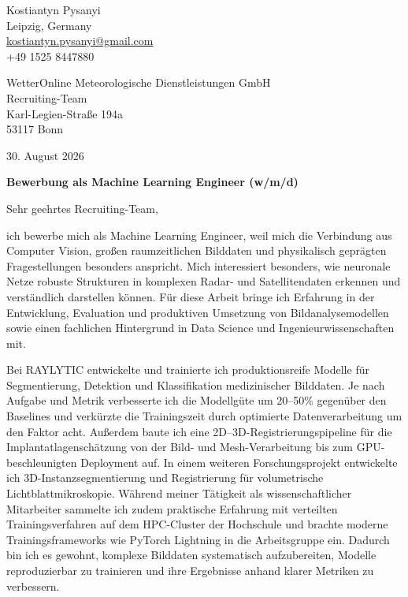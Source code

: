 \documentclass[11pt,a4paper]{article}
\begin{document}
\begin{flushright}
Kostiantyn Pysanyi\\
Leipzig, Germany\\
\href{mailto:kostiantyn.pysanyi@gmail.com}{kostiantyn.pysanyi@gmail.com}\\
+49 1525 8447880
\end{flushright}

WetterOnline Meteorologische Dienstleistungen GmbH\\
Recruiting-Team\\
Karl-Legien-Straße 194a\\
53117 Bonn

\begin{flushright}
30. August 2026
\end{flushright}

\textbf{Bewerbung als Machine Learning Engineer (w/m/d)}

Sehr geehrtes Recruiting-Team,

ich bewerbe mich als Machine Learning Engineer, weil mich die Verbindung aus Computer Vision, großen raumzeitlichen Bilddaten und physikalisch geprägten Fragestellungen besonders anspricht. Mich interessiert besonders, wie neuronale Netze robuste Strukturen in komplexen Radar- und Satellitendaten erkennen und verständlich darstellen können. Für diese Arbeit bringe ich Erfahrung in der Entwicklung, Evaluation und produktiven Umsetzung von Bildanalysemodellen sowie einen fachlichen Hintergrund in Data Science und Ingenieurwissenschaften mit.

Bei RAYLYTIC entwickelte und trainierte ich produktionsreife Modelle für Segmentierung, Detektion und Klassifikation medizinischer Bilddaten. Je nach Aufgabe und Metrik verbesserte ich die Modellgüte um 20--50\% gegenüber den Baselines und verkürzte die Trainingszeit durch optimierte Datenverarbeitung um den Faktor acht. Außerdem baute ich eine 2D--3D-Registrierungspipeline für die Implantatlagenschätzung von der Bild- und Mesh-Verarbeitung bis zum GPU-beschleunigten Deployment auf. In einem weiteren Forschungsprojekt entwickelte ich 3D-Instanzsegmentierung und Registrierung für volumetrische Lichtblattmikroskopie. Während meiner Tätigkeit als wissenschaftlicher Mitarbeiter sammelte ich zudem praktische Erfahrung mit verteilten Trainingsverfahren auf dem HPC-Cluster der Hochschule und brachte moderne Trainingsframeworks wie PyTorch Lightning in die Arbeitsgruppe ein. Dadurch bin ich es gewohnt, komplexe Bilddaten systematisch aufzubereiten, Modelle reproduzierbar zu trainieren und ihre Ergebnisse anhand klarer Metriken zu verbessern.
\end{document}
